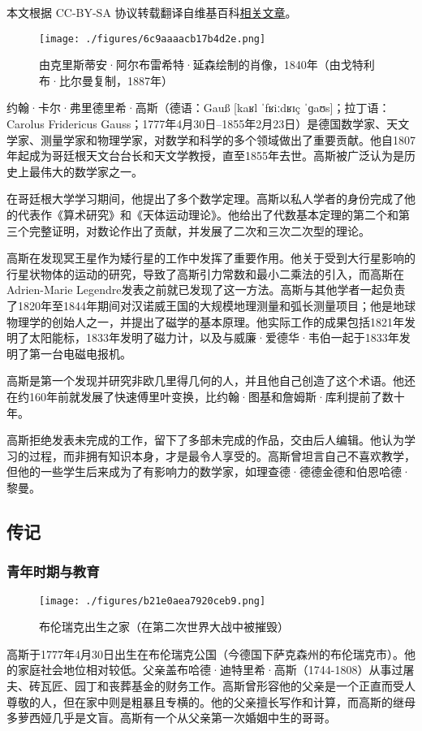 
本文根据 CC-BY-SA 协议转载翻译自维基百科\href{https://en.wikipedia.org/wiki/Carl_Friedrich_Gauss}{相关文章}。

\begin{figure}[ht]
\centering
\texttt{[image: ./figures/6c9aaaacb17b4d2e.png]}
\caption{由克里斯蒂安·阿尔布雷希特·延森绘制的肖像，1840年（由戈特利布·比尔曼复制，1887年）} \label{fig_KRGS_3}
\end{figure}
约翰·卡尔·弗里德里希·高斯（德语：Gauß [kaʁl ˈfʁiːdʁɪç ˈɡaʊs]；拉丁语：Carolus Fridericus Gauss；1777年4月30日–1855年2月23日）是德国数学家、天文学家、测量学家和物理学家，对数学和科学的多个领域做出了重要贡献。他自1807年起成为哥廷根天文台台长和天文学教授，直至1855年去世。高斯被广泛认为是历史上最伟大的数学家之一。

在哥廷根大学学习期间，他提出了多个数学定理。高斯以私人学者的身份完成了他的代表作《算术研究》和《天体运动理论》。他给出了代数基本定理的第二个和第三个完整证明，对数论作出了贡献，并发展了二次和三次二次型的理论。

高斯在发现冥王星作为矮行星的工作中发挥了重要作用。他关于受到大行星影响的行星状物体的运动的研究，导致了高斯引力常数和最小二乘法的引入，而高斯在Adrien-Marie Legendre发表之前就已发现了这一方法。高斯与其他学者一起负责了1820年至1844年期间对汉诺威王国的大规模地理测量和弧长测量项目；他是地球物理学的创始人之一，并提出了磁学的基本原理。他实际工作的成果包括1821年发明了太阳能标，1833年发明了磁力计，以及与威廉·爱德华·韦伯一起于1833年发明了第一台电磁电报机。

高斯是第一个发现并研究非欧几里得几何的人，并且他自己创造了这个术语。他还在约160年前就发展了快速傅里叶变换，比约翰·图基和詹姆斯·库利提前了数十年。

高斯拒绝发表未完成的工作，留下了多部未完成的作品，交由后人编辑。他认为学习的过程，而非拥有知识本身，才是最令人享受的。高斯曾坦言自己不喜欢教学，但他的一些学生后来成为了有影响力的数学家，如理查德·德德金德和伯恩哈德·黎曼。
\subsection{传记}  
\subsubsection{青年时期与教育}
\begin{figure}[ht]
\centering
\texttt{[image: ./figures/b21e0aea7920ceb9.png]}
\caption{布伦瑞克出生之家（在第二次世界大战中被摧毁）} \label{fig_KRGS_1}
\end{figure}
高斯于1777年4月30日出生在布伦瑞克公国（今德国下萨克森州的布伦瑞克市）。他的家庭社会地位相对较低。父亲盖布哈德·迪特里希·高斯（1744-1808）从事过屠夫、砖瓦匠、园丁和丧葬基金的财务工作。高斯曾形容他的父亲是一个正直而受人尊敬的人，但在家中则是粗暴且专横的。他的父亲擅长写作和计算，而高斯的继母多萝西娅几乎是文盲。高斯有一个从父亲第一次婚姻中生的哥哥。

